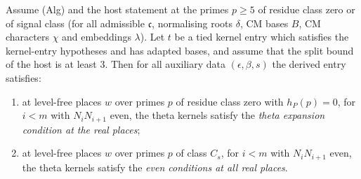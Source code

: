 \begin{theorem}\label{pf:reckernel:frobConj}
Assume \textup{(Alg)} and the host statement at the primes $p\ge5$ of residue class zero or of signal class (for all
admissible $\mathfrak c$, normalising roots $\delta$, CM bases $B$, CM characters $\chi$ and embeddings $\lambda$). Let $t$
be a tied kernel entry which satisfies the kernel-entry hypotheses and has adapted bases, and assume that the split bound
of the host is at least $3$. Then for all auxiliary data $(\epsilon,\beta,s)$ the derived entry satisfies:
\begin{enumerate}
\item at level-free places $w$ over primes $p$ of residue class zero with $h_P(p)=0$, for $i<m$ with $N_iN_{i+1}$ even,
  the theta kernels satisfy the \emph{theta expansion condition at the real places};
\item at level-free places $w$ over primes $p$ of class $C_s$, for $i<m$ with $N_iN_{i+1}$ even, the theta kernels satisfy
  the \emph{even conditions at all real places}.
\end{enumerate}
\end{theorem}

